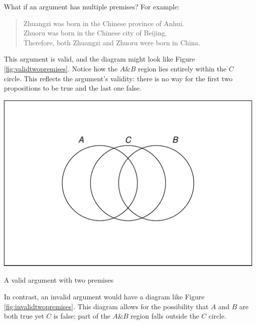 \documentclass[justified]{tufte-book}
\renewcommand{\wedge}{\mathbin{\&}}
\newenvironment{argument}{\begin{quote}\normalsize}{\end{quote}}
\theoremstyle{definition}
\theoremstyle{definition}
\theoremstyle{definition}
\theoremstyle{remark}
\begin{document}
What if an argument has multiple premises? For example:

\begin{argument}
Zhuangzi was born in the Chinese province of Anhui.\\
Zhuoru was born in the Chinese city of Beijing.\\
Therefore, both Zhuangzi and Zhuoru were born in China.
\end{argument}

This argument is valid, and the diagram might look like Figure
\ref{fig:validtwopremises}. Notice how the \(A \wedge B\) region lies
entirely within the \(C\) circle. This reflects the argument's validity:
there is no way for the first two propositions to be true and the last
one false.

\begin{marginfigure}
\includegraphics{_main_files/figure-latex/validtwopremises-1} \caption[A valid argument with two premises]{A valid argument with two premises}\label{fig:validtwopremises}
\end{marginfigure}

In contrast, an invalid argument would have a diagram like Figure
\ref{fig:invalidtwopremises}. This diagram allows for the possibility
that \(A\) and \(B\) are both true yet \(C\) is false; part of the
\(A \wedge B\) region falls outside the \(C\) circle.
\end{document}
